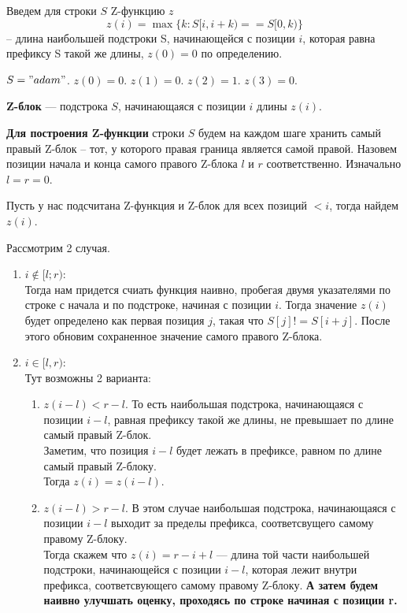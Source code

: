 Введем для строки $S$ Z-функцию $z$ 
\[
	z(i) = \max \{k: S[i, i + k) == S[0, k)\}
\]
-- длина наибольшей подстроки S, начинающейся с позиции $i$, которая равна префиксу S такой же длины, $z(0) = 0$ по определению.

\begin{example}
	$S = "adam"$. 
	$z(0) = 0.$
	$z(1) = 0.$
	$z(2) = 1.$ 
	$z(3) = 0.$
\end{example}

\begin{Def}
	\textbf{Z-блок} --- подстрока $S$, начинающаяся с позиции  $i$ длины  $z(i)$.
\end{Def}

\textbf{Для построения Z-функции} строки $S$ будем на каждом шаге хранить самый правый  Z-блок -- тот, у которого правая граница является самой правой.
Назовем позиции начала и конца самого правого Z-блока $l$ и  $r$ соответственно. Изначально $l = r = 0$. 

Пусть у нас подсчитана Z-функция и Z-блок для всех позиций $< i$, тогда найдем  $z(i)$.

Рассмотрим 2 случая. 
\begin{enumerate}
	\item \underline{$i \notin [l; r)$}: \\
		Тогда нам придется счиать функция наивно, пробегая двумя указателями по строке с начала и по подстроке, начиная с позиции $i$. Тогда значение $z(i)$ будет определено как первая позиция $j$, такая что  $S[j] != S[i + j]$.
		После этого обновим сохраненное значение самого правого Z-блока.
	\item \underline{$i \in [l, r)$}: \\
		Тут возможны 2 варианта:
		\begin{enumerate}
			\item $z(i - l) < r - l$. То есть наибольшая подстрока, начинающаяся с позиции $i - l$, равная префиксу такой же длины, не превышает по длине самый правый Z-блок. \\
				Заметим, что позиция $i - l$ будет лежать в префиксе, равном по длине самый правый Z-блоку. \\
				Тогда $z(i) = z(i - l)$. \\
			\item $z(i - l) > r - l$. В этом случае наибольшая подстрока, начинающаяся с позиции $i - l$ выходит за пределы префикса, соответсвущего самому правому Z-блоку. \\
				Тогда скажем  что $z(i) = r - i + l$ --- длина той части наибольшей подстроки, начинающейся с позиции  $i - l$, которая лежит внутри префикса, соответсвующего самому правому Z-блоку. \textbf{А затем будем наивно улучшать оценку, проходясь по строке начиная с позиции r.}
		\end{enumerate}
\end{enumerate}

